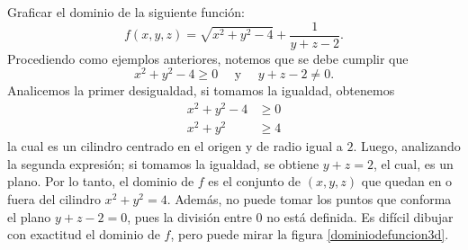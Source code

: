 \begin{example}
    Graficar el dominio de la siguiente función:
    $$f(x, y, z) = \sqrt{x^2 + y^2 - 4} + \frac{1}{y + z - 2}.$$
    \solucion Procediendo como ejemplos anteriores, notemos que se debe cumplir que
    $$x^2 + y^2 - 4 \geq 0 \quad \text{ y } \quad y + z - 2 \neq 0.$$
    Analicemos la primer desigualdad, si tomamos la igualdad, obtenemos
    \begin{align*}
        x^2 + y^2 - 4 & \geq 0 \\
        x^2 + y^2 & \geq 4
    \end{align*}
    la cual es un cilindro centrado en el origen y de radio igual a $2$. Luego, analizando la segunda expresión; si tomamos la igualdad, se obtiene $y + z = 2$, el cual, es un plano. Por lo tanto, el dominio de $f$ es el conjunto de $(x, y, z)$ que quedan en o fuera del cilindro $x^2 + y^2 = 4$. Además, no puede tomar los puntos que conforma el plano $y + z - 2 = 0$, pues la división entre $0$ no está definida. Es difícil dibujar con exactitud el dominio de $f$, pero puede mirar la figura \ref{dominiodefuncion3d}.
\end{example}

